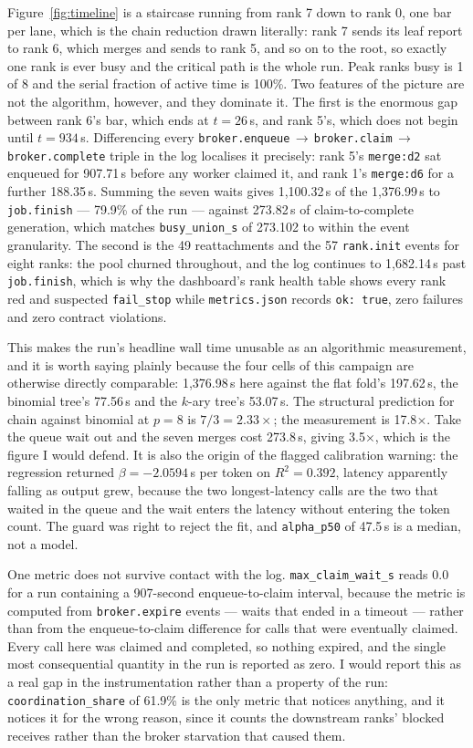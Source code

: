 \documentclass[11pt]{article}
\begin{document}
Figure~\ref{fig:timeline} is a staircase running from rank 7 down to rank 0, one bar per
lane, which is the chain reduction drawn literally: rank 7 sends its leaf report to rank 6,
which merges and sends to rank 5, and so on to the root, so exactly one rank is ever busy
and the critical path is the whole run. Peak ranks busy is 1 of 8 and the serial fraction of
active time is 100\%. Two features of the picture are not the algorithm, however, and they
dominate it. The first is the enormous gap between rank 6's bar, which ends at $t=26$\,s,
and rank 5's, which does not begin until $t=934$\,s. Differencing every
\texttt{broker.enqueue}\,$\to$\,\texttt{broker.claim}\,$\to$\,\texttt{broker.complete}
triple in the log localises it precisely: rank 5's \texttt{merge:d2} sat enqueued for
907.71\,s before any worker claimed it, and rank 1's \texttt{merge:d6} for a further
188.35\,s. Summing the seven waits gives 1{,}100.32\,s of the 1{,}376.99\,s to
\texttt{job.finish} --- 79.9\% of the run --- against 273.82\,s of claim-to-complete
generation, which matches \texttt{busy\_union\_s} of 273.102 to within the event
granularity. The second is the 49 reattachments and the 57 \texttt{rank.init} events for
eight ranks: the pool churned throughout, and the log continues to 1{,}682.14\,s past
\texttt{job.finish}, which is why the dashboard's rank health table shows every rank red
and suspected \texttt{fail\_stop} while \texttt{metrics.json} records \texttt{ok: true},
zero failures and zero contract violations.

This makes the run's headline wall time unusable as an algorithmic measurement, and it is
worth saying plainly because the four cells of this campaign are otherwise directly
comparable: 1{,}376.98\,s here against the flat fold's 197.62\,s, the binomial tree's
77.56\,s and the $k$-ary tree's 53.07\,s. The structural prediction for chain against
binomial at $p=8$ is $7/3 = 2.33\times$; the measurement is 17.8$\times$. Take the queue
wait out and the seven merges cost 273.8\,s, giving 3.5$\times$, which is the figure I would
defend. It is also the origin of the flagged calibration warning: the regression returned
$\beta = -2.0594$\,s per token on $R^2 = 0.392$, latency apparently falling as output grew,
because the two longest-latency calls are the two that waited in the queue and the wait
enters the latency without entering the token count. The guard was right to reject the fit,
and \texttt{alpha\_p50} of 47.5\,s is a median, not a model.

One metric does not survive contact with the log. \texttt{max\_claim\_wait\_s} reads 0.0
for a run containing a 907-second enqueue-to-claim interval, because the metric is computed
from \texttt{broker.expire} events --- waits that ended in a timeout --- rather than from
the enqueue-to-claim difference for calls that were eventually claimed. Every call here was
claimed and completed, so nothing expired, and the single most consequential quantity in
the run is reported as zero. I would report this as a real gap in the instrumentation
rather than a property of the run: \texttt{coordination\_share} of 61.9\% is the only
metric that notices anything, and it notices it for the wrong reason, since it counts the
downstream ranks' blocked receives rather than the broker starvation that caused them.
\end{document}
